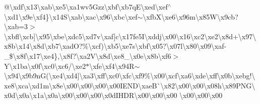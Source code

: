@\textbackslash{}xdf\textbackslash{}x13\textbackslash{}xab\textbackslash{}xe5\textbackslash{}xa1wv5\+Gzz\textbackslash{}xbf\textbackslash{}xb7q\+E\textbackslash{}xed\textbackslash{}xef$^\wedge$\textbackslash{}xd1\textbackslash{}x9e\textbackslash{}xf4\}\textbackslash{}x14\+S\textbackslash{}xab\textbackslash{}xac\textbackslash{}x96\textbackslash{}xbc\textbackslash{}xef$\sim$\textbackslash{}xfb\+X\textbackslash{}xe6\textbackslash{}x96m\textbackslash{}x85\+W\textbackslash{}x9cb?\textbackslash{}xab=3$>$\textbackslash{}xbfl\textbackslash{}xcb\mbox{]}\textbackslash{}x95\textbackslash{}xbe\textbackslash{}xdc5\textbackslash{}xd7v\textbackslash{}xaf\mbox{]}c\textbackslash{}x17fe5\+I\textbackslash{}xddj\textbackslash{}x00\textbackslash{}x16\textbackslash{}xc2\textbackslash{}xe2\textbackslash{}x8d+\textbackslash{}x97\textbackslash{}x8b\textbackslash{}x14\textbackslash{}x8d\textbackslash{}xb7\textbackslash{}xad\+O?\%\textbackslash{}xcf)\textbackslash{}xb5\textbackslash{}xe7s\textbackslash{}xbf\textbackslash{}x05?\textbackslash{}x07l\textbackslash{}x80\textbackslash{}x09\textbackslash{}xaf-\/\+\_\+\$\textbackslash{}x8f\textbackslash{}x17\textbackslash{}xe4\},\textbackslash{}x8f?\textbackslash{}xa2\+V\textbackslash{}x8d\textbackslash{}xe8\+\_\+\textbackslash{}x0e\textbackslash{}x8b\textbackslash{}xf6$>$\+Y\textquotesingle{}\textbackslash{}x1ba\textbackslash{}x0f\textbackslash{}xc0\textbackslash{}xc6/\textbackslash{}xe2$\ast$\textbackslash{}xfe\textbackslash{}xf4\textbackslash{}x94\+R$\sim$\textbackslash{}x94\textbackslash{}x9b9n\+G(\textbackslash{}xe4\textbackslash{}xd4\mbox{]}\textbackslash{}xa3\textbackslash{}xff\textbackslash{}xc0\textbackslash{}xfc\textbackslash{}xf9\%\textbackslash{}x00\textbackslash{}xcf\textbackslash{}xa6\textbackslash{}xde\textbackslash{}xff\textbackslash{}x0b\textbackslash{}xebg!\textbackslash{}xe8\textbackslash{}xca\textbackslash{}xd1m\textbackslash{}x8e\textbackslash{}x00\textbackslash{}x00\textbackslash{}x00\textbackslash{}x00\+I\+E\+N\+D\textbackslash{}xae\+B\`{}\textbackslash{}x82\textbackslash{}x00\textbackslash{}x00\textbackslash{}x08h\textbackslash{}x89\+P\+N\+G\textbackslash{}x0d\textbackslash{}x0a\textbackslash{}x1a\textbackslash{}x0a\textbackslash{}x00\textbackslash{}x00\textbackslash{}x00\textbackslash{}x0d\+I\+H\+D\+R\textbackslash{}x00\textbackslash{}x00\textbackslash{}x00 \textbackslash{}x00\textbackslash{}x00\textbackslash{}x00 
